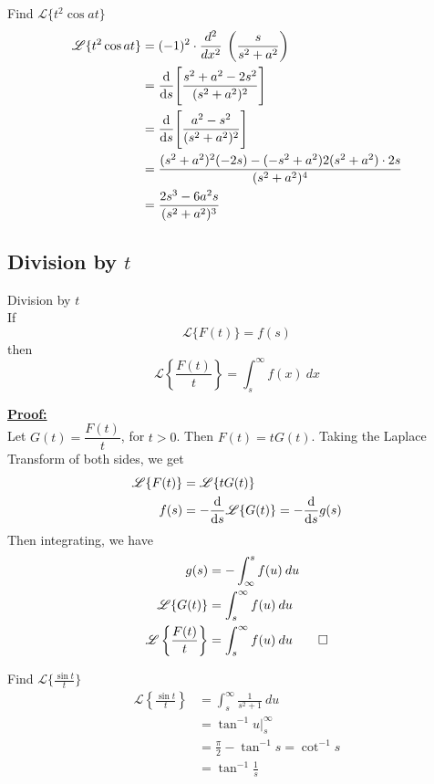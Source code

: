 \documentclass[12pt]{article}
\newcommand{\Lap}{\mathscr{L}}
\begin{document}
\begin{example}{Find $\Lap \{ t^2 \cos{at} \}$}{}
    \begin{align*}
        \Lap \{ t^2 \cos{at} \} &= (-1)^2 \cdot \frac{d^2}{d{x^2}} \: \left( \frac{s}{s^2 + a^2} \right) \\
        &= \dv{}{s} { \left[ \frac{s^2 + a^2 - 2s^2}{ (s^2 + a^2)^2 } \right] } \\
        &= \dv{}{s} { \left[ \frac{a^2 - s^2}{(s^2 + a^2)^2} \right] } \\
        &= \frac{(s^2+a^2)^2(-2s) - (-s^2+a^2)2(s^2+a^2)\cdot2s}{(s^2+a^2)^4} \\
        &= \frac{2s^3 - 6a^2s}{(s^2+a^2)^3}
    \end{align*}
\end{example}


\subsection{Division by $t$}
\begin{theorem}{Division by $t$}{}
    \\If \[
        \Lap \{ F(t) \} = f(s)
    \] then \[
        \Lap \left\{ \frac{F(t)}{t} \right\} = \int_{s}^{\infty} {f(x)} \: d{x}
    \]
\end{theorem}

\underline{\textbf{Proof: }} \\
Let $G(t) = \dfrac{F(t)}{t}$, for $t>0$. Then $F(t) = t G(t)$. Taking the Laplace Transform of both sides, we get
\begin{align*}
    \Lap \{ F(t) \} &= \Lap \{ t G(t) \} \\
    f(s) &= -\dv{s} \Lap \{ G(t) \} = - \dv{s} g(s)
\end{align*}
Then integrating, we have
\begin{align*}
    g(s) &= - \int_{\infty}^{s} {f(u)} \: d{u} \\
    \Lap \{ G(t) \} &= \int_{s}^{\infty} {f(u)} \: d{u} \\
    \Lap \left\{ \frac{F(t)}{t} \right\} &= \int_{s}^{\infty} {f(u)} \: d{u} \qed
\end{align*}

\begin{example}{Find $\Lap \{ \frac{\sin{t}}{t} \}$}{}
    \begin{align*}
        \Lap \left\{ \frac{\sin{t}}{t} \right\} &= \int_{s}^{\infty} {\frac{1}{s^2+1}} \: d{u} \\
        &= \tan^{-1}{u} \bigg|_s^\infty \\
        &= \frac{\pi}{2} - \tan^{-1}{s} = \cot^{-1}{s} \\
        &= \tan^{-1}{\frac{1}{s}}
    \end{align*}
\end{example}
\end{document}

